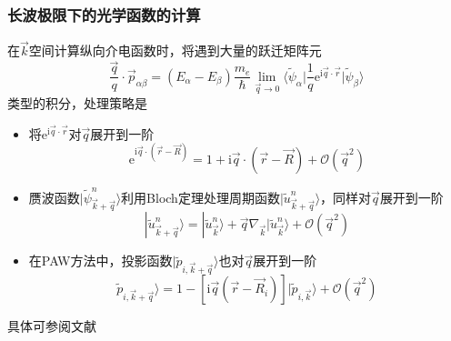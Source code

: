 {\frame
{
	\frametitle{长波极限下的光学函数的计算}
	在$\vec k$空间计算纵向介电函数时，将遇到大量的跃迁矩阵元
	\begin{displaymath}
		\frac{\vec q}q\cdot\vec p_{\alpha\beta}=(E_{\alpha}-E_{\beta})\frac{m_e}{\hbar}\lim_{\vec q\rightarrow0}\bigg\langle\tilde\psi_{\alpha}\bigg|\frac1q\mathrm{e}^{\mathrm{i}\vec q\cdot\vec r}\bigg|\tilde\psi_{\beta}\bigg\rangle
	\end{displaymath}
	类型的积分，处理策略是
	\begin{itemize}
		\item 将$\mathrm{e}^{\mathrm{i}\vec q\cdot\vec r}$对$\vec q$展开到一阶
			\begin{displaymath}
				\mathrm{e}^{\mathrm{i}\vec q\cdot(\vec r-\vec R)}=1+\mathrm{i}\vec q\cdot(\vec r-\vec R)+\mathcal{O}(\vec q^2)
			\end{displaymath}
		\item 赝波函数$|\tilde\psi_{\vec k+\vec q}^n\rangle$利用\textrm{Bloch}定理处理周期函数$|\tilde{u}_{\vec k+\vec q}^n\rangle$，同样对$\vec q$展开到一阶
			\begin{displaymath}
				|\tilde u_{\vec k+\vec q}^n\rangle=|\tilde u_{\vec k}^n\rangle+\vec q\nabla_{\vec k}|\tilde u_{\vec k}^n\rangle+\mathcal{O}(\vec q^2)
			\end{displaymath}
		\item 在\textrm{PAW}方法中，投影函数$|\tilde p_{i,\vec k+\vec q}\rangle$也对$\vec q$展开到一阶
			\begin{displaymath}
				\tilde p_{i,\vec k+\vec q}\rangle=1-[\mathrm{i}\vec q(\vec r-\vec R_i)]|\tilde p_{i,\vec k}\rangle+\mathcal{O}(\vec q^2)
			\end{displaymath}
	\end{itemize}
	具体可参阅文献\cite{PRB73-045112_2006}
}

}
